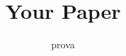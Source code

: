 \documentclass[newtx, it, fancy, 11pt, hang]{mybook}
\title{Your Paper}
\subtitle{prova}
\institute{Università di Roma Tor Vergata}
\begin{document}
\maketitle
\frontmatter
\tableofcontents
\mainmatter


\nocite{orangeBook,elegantBook}
\printbibliography[heading=bibintoc]
\end{document}
